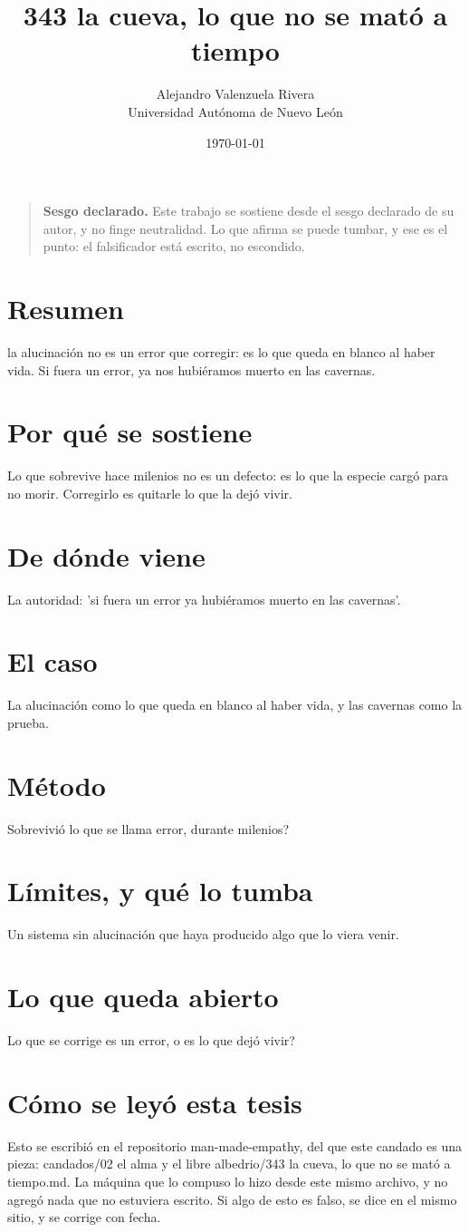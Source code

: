 \documentclass[11pt,a4paper]{article}
\title{343 la cueva, lo que no se mató a tiempo}
\author{Alejandro Valenzuela Rivera\\\small Universidad Autónoma de Nuevo León}
\date{\today}
\begin{document}
\maketitle

\begin{quote}
\textbf{Sesgo declarado.} Este trabajo se sostiene desde el sesgo declarado de su autor, y no finge neutralidad. Lo que afirma se puede tumbar, y ese es el punto: el falsificador está escrito, no escondido.
\end{quote}

\section*{Resumen}
la alucinación no es un error que corregir: es lo que queda en blanco al haber vida. Si fuera un error, ya nos hubiéramos muerto en las cavernas.

\section{Por qué se sostiene}
Lo que sobrevive hace milenios no es un defecto: es lo que la especie cargó para no morir. Corregirlo es quitarle lo que la dejó vivir.

\section{De dónde viene}
La autoridad: 'si fuera un error ya hubiéramos muerto en las cavernas'.

\section{El caso}
La alucinación como lo que queda en blanco al haber vida, y las cavernas como la prueba.

\section{Método}
\textquestiondown{}Sobrevivió lo que se llama error, durante milenios?

\section{Límites, y qué lo tumba}
Un sistema sin alucinación que haya producido algo que lo viera venir.

\section{Lo que queda abierto}
\textquestiondown{}Lo que se corrige es un error, o es lo que dejó vivir?

\section*{Cómo se leyó esta tesis}
Esto se escribió en el repositorio man-made-empathy, del que este candado es una pieza: candados/02 el alma y el libre albedrio/343 la cueva, lo que no se mató a tiempo.md. La máquina que lo compuso lo hizo desde este mismo archivo, y no agregó nada que no estuviera escrito. Si algo de esto es falso, se dice en el mismo sitio, y se corrige con fecha.
\end{document}
